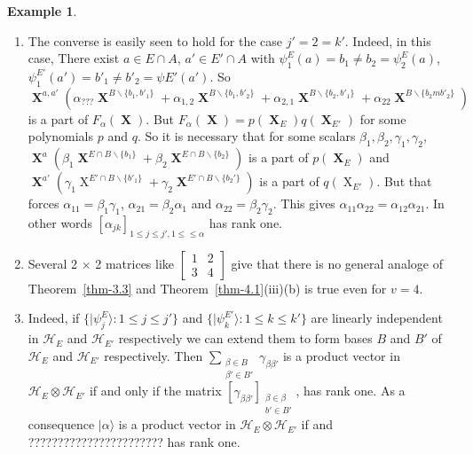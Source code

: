 \documentclass[a4paper,12pt]{article}
\DeclareMathOperator{\x}{\mathrm{X}}
\theoremstyle{definition}
\theoremstyle{underlinethm}
\newtheorem{example}{Example}[section]
\theoremstyle{definition}
\begin{document}
\begin{example}
\begin{enumerate}[label=(\roman*)]
\item The converse is easily seen to hold for the case $j'=2=k'$. Indeed, in this case, There exist $a \in E \cap A$, $a' \in E' \cap A$ with $\psi_{1}^{E}(a) = b_{1} \neq b_{2} = \psi_{2}^{E}(a)$, $\psi_{1}^{E'}(a') = b'_{1} \neq b'_{2} = \psi E'(a')$. So $\boldsymbol{\x}^{a,a'} (\alpha_{???} \boldsymbol{\x}^{B \smallsetminus \{b_{1}, b'_{1}\}} + \alpha_{1, 2} \boldsymbol{\x}^{B\smallsetminus \{b_{1}, b'_{2}\}} + \alpha_{2, 1} \boldsymbol{\x}^{B\smallsetminus \{b_{2}, b'_{1}\}} + \alpha_{2 2} \boldsymbol{\x}^{B \smallsetminus \{b_{2}m b'_{2}\}} )$  is a part of $F_{\alpha}(\boldsymbol{\x})$. But $F_{\alpha}(\boldsymbol{\x}) = p (\boldsymbol{\x}_{E})q(\boldsymbol{\x}_{E'})$ for some polynomials $p$ and $q$. So it is necessary that for some scalars $\beta_{1}, \beta_{2}, \gamma_{1}, \gamma_{2} $, $\boldsymbol{\x}^{a} \left(\beta_{1}\boldsymbol{\x}^{E \cap B \smallsetminus \{b_{1}\}} + \beta_{2} \boldsymbol{\x}^{E \cap B \smallsetminus\{b_{2}\}} \right)$ is a part of $p(\boldsymbol{\x}_{E})$ and\\ $\boldsymbol{\x}^{a'}(\gamma_{1} \x^{E'\cap B \smallsetminus \{b'_{1}\}} + \gamma_{2} \boldsymbol{\x}^{E'\cap B\smallsetminus \{b_{2}'\}})$ is a part of $q(\x_{E'})$. But that forces $\alpha_{11} = \beta_{1}\gamma_{1}$, $\alpha_{2 1}= \beta_{2} \alpha_{1}$ and $\alpha_{22}= \beta_{2}\gamma_{2}$. This gives $\alpha_{11} \alpha_{22} = \alpha_{12} \alpha_{21}$. In other words $[\alpha_{jk}]_{1 \leq j \leq j', 1 \leq \leq \alpha}$ has rank one.

\item Several 2 $\times$ 2 matrices like $\begin{bmatrix}1 & 2\\3 & 4 \end{bmatrix}$ give that  there is no general analoge of Theorem~\ref{thm-3.3} and Theorem~\ref{thm-4.1}(iii)(b) is true even for $v=4$.

\item Indeed, if $\{| \psi_{j}^{E} \rangle : 1 \leq j \leq j' \}$ and $\{| \psi_{k}^{E'} \rangle : 1 \leq k \leq k'\}$ are linearly independent in $\mathcal{H}_{E}$ and $\mathcal{H}_{E'}$ respectively we can extend them to form bases $B$ and $B'$ of $\mathcal{H}_{E}$ and $\mathcal{H}_{E'}$ respectively. Then $\sum_{\substack{\beta \in B \\ \beta' \in B'}} \gamma_{\beta \beta'}$ is a product vector in $\mathcal{H}_{E}\otimes \mathcal{H}_{E'}$ if and only if the matrix $[\gamma_{\beta \beta'}]_{\substack{\beta \in \beta \\ b' \in B'}}$, has rank one. As a consequence $| \alpha \rangle$ is a product vector in $\mathcal{H}_{E} \otimes \mathcal{H}_{E'}$ if and ??????????????????????? has rank one. 

\end{enumerate}
\end{example}
\end{document}
